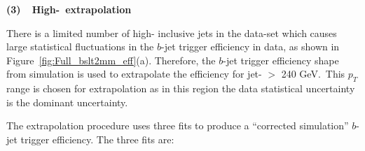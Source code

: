 \FloatBarrier

\noindent
\textbf{(3)~~High-\pT{}~extrapolation}
\label{sec:trig-highPtExtrap}

There is a limited number of high-\pT{} inclusive jets in the data-set which
causes large statistical fluctuations in the $b$-jet trigger efficiency in data, as shown in Figure~\ref{fig:Full_bslt2mm_eff}(a).
Therefore, the $b$-jet trigger efficiency shape from simulation is used to extrapolate the efficiency for jet-\pT{} $>$ 240 GeV.
$\,$This $p_T$ range is chosen for extrapolation as in this region the data statistical uncertainty is the dominant uncertainty.

The extrapolation procedure uses three fits to produce a ``corrected simulation'' $b$-jet trigger efficiency.
The three fits are:
\vspace{-0.5em}
